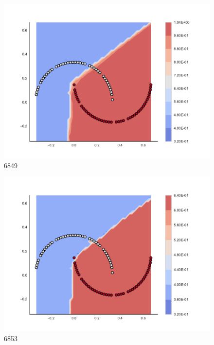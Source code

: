 \begin{subfigure}[b]{0.09\textwidth}
    \includegraphics[clip, trim=2.35cm 1.75cm 4.5cm 0cm,width=\textwidth]{img/convergence/6849.pdf}
    \caption{6849}
    \label{fig:convergence_6849}
\end{subfigure}
%
\begin{subfigure}[b]{0.09\textwidth}
    \includegraphics[clip, trim=2.35cm 1.75cm 4.5cm 0cm,width=\textwidth]{img/convergence/6853.pdf}
    \caption{6853}
    \label{fig:convergence_6853}
\end{subfigure}
%
